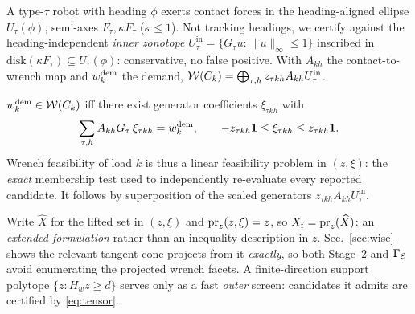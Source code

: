 A type-$\tau$ robot with heading $\phi$ exerts contact forces in the heading-aligned ellipse
$U_\tau(\phi)$, semi-axes $F_\tau,\kappa F_\tau$ ($\kappa\le1$). Not tracking headings, we
certify against the heading-independent \emph{inner zonotope}
$U_\tau^{\mathrm{in}}=\{G_\tau u:\|u\|_\infty\le1\}$ inscribed in
$\mathrm{disk}(\kappa F_\tau)\subseteq U_\tau(\phi)$: conservative, no false positive. With
$A_{kh}$ the contact-to-wrench map and $w^{\mathrm{dem}}_k$ the demand,
$\mathcal{W}(C_k)=\bigoplus_{\tau,h}z_{\tau kh}A_{kh}U_\tau^{\mathrm{in}}$.

\begin{lemma}
\label{prop:membership}
$w^{\mathrm{dem}}_k\in\mathcal{W}(C_k)$ iff there exist generator coefficients $\xi_{\tau kh}$ with
\begin{equation}
\sum_{\tau,h}A_{kh}G_\tau\,\xi_{\tau kh}=w^{\mathrm{dem}}_k,
\qquad
-z_{\tau kh}\mathbf 1\le\xi_{\tau kh}\le z_{\tau kh}\mathbf 1 .
\label{eq:tensor}
\end{equation}
Wrench feasibility of load $k$ is thus a linear feasibility problem in $(z,\xi)$: the
\emph{exact} membership test used to independently re-evaluate every reported candidate. It
follows by superposition of the scaled generators $z_{\tau kh}A_{kh}U_\tau^{\mathrm{in}}$.
\end{lemma}
Write $\widehat X$ for the lifted set in $(z,\xi)$ and $\operatorname{pr}_z(z,\xi)=z$, so
$X_{\mathrm f}=\operatorname{pr}_z(\widehat X)$: an \emph{extended formulation} rather than an inequality
description in $z$. Sec.~\ref{sec:wise} shows the relevant tangent cone projects from it
\emph{exactly}, so both Stage~2 and $\Gamma_{\mathcal{E}}$ avoid enumerating the projected
wrench facets. A finite-direction support polytope $\{z:H_wz\ge d\}$ serves only as a fast \emph{outer}
screen: candidates it admits are certified by \eqref{eq:tensor}.

